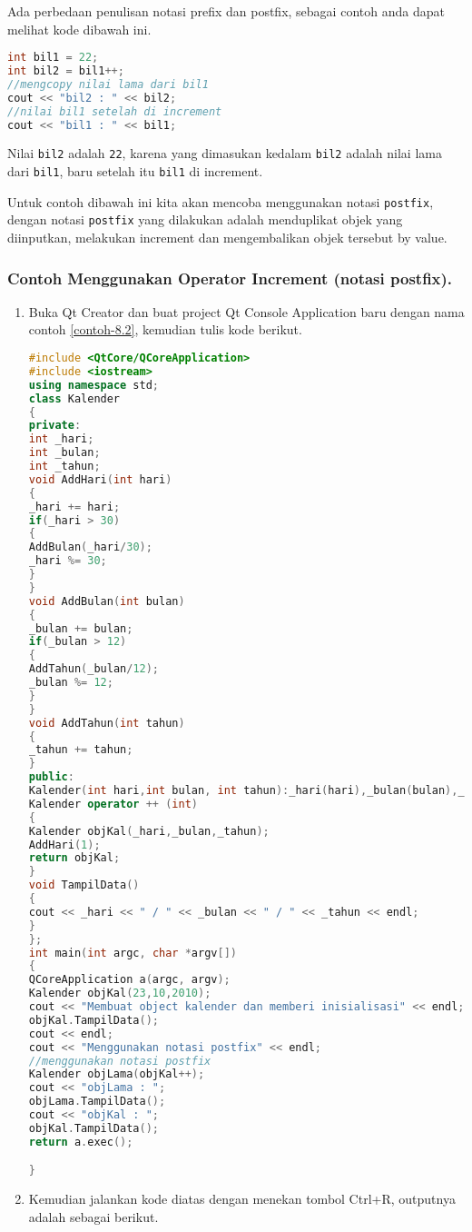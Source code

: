 Ada perbedaan penulisan notasi prefix dan postfix, sebagai contoh anda
dapat melihat kode dibawah ini.

\begin{lstlisting}[language=c++, numbers=none]
int bil1 = 22;
int bil2 = bil1++;
//mengcopy nilai lama dari bil1
cout << "bil2 : " << bil2;
//nilai bil1 setelah di increment
cout << "bil1 : " << bil1;
\end{lstlisting}

Nilai \texttt{bil2} adalah \texttt{22}, karena yang dimasukan kedalam
\texttt{bil2} adalah nilai lama dari \texttt{bil1}, baru setelah itu
\texttt{bil1} di increment.

Untuk contoh dibawah ini kita akan mencoba menggunakan notasi
\texttt{postfix}, dengan notasi \texttt{postfix} yang dilakukan adalah
menduplikat objek yang diinputkan, melakukan increment dan mengembalikan
objek tersebut by value.

\subsubsection*{Contoh  Menggunakan Operator Increment (notasi postfix).}

\begin{enumerate}

\item
  Buka Qt Creator dan buat project Qt Console Application baru dengan
  nama contoh \ref{contoh-8.2}, kemudian tulis kode berikut.

\begin{lstlisting}[language=c++, caption=Menggunakan Operator Increment (notasi postfix), label=contoh-8.2]
#include <QtCore/QCoreApplication>
#include <iostream>
using namespace std;
class Kalender
{
private:
int _hari;
int _bulan;
int _tahun;
void AddHari(int hari)
{
_hari += hari;
if(_hari > 30)
{
AddBulan(_hari/30);
_hari %= 30;
}
}
void AddBulan(int bulan)
{
_bulan += bulan;
if(_bulan > 12)
{
AddTahun(_bulan/12);
_bulan %= 12;
}
}
void AddTahun(int tahun)
{
_tahun += tahun;
}
public:
Kalender(int hari,int bulan, int tahun):_hari(hari),_bulan(bulan),_tahun(tahun){ }
Kalender operator ++ (int)
{
Kalender objKal(_hari,_bulan,_tahun);
AddHari(1);
return objKal;
}
void TampilData()
{
cout << _hari << " / " << _bulan << " / " << _tahun << endl;
}
};
int main(int argc, char *argv[])
{
QCoreApplication a(argc, argv);
Kalender objKal(23,10,2010);
cout << "Membuat object kalender dan memberi inisialisasi" << endl;
objKal.TampilData();
cout << endl;
cout << "Menggunakan notasi postfix" << endl;
//menggunakan notasi postfix
Kalender objLama(objKal++);
cout << "objLama : ";
objLama.TampilData();
cout << "objKal : ";
objKal.TampilData();
return a.exec();

}
\end{lstlisting}
\item
  Kemudian jalankan kode diatas dengan menekan tombol Ctrl+R, outputnya
  adalah sebagai berikut.
\end{enumerate}

